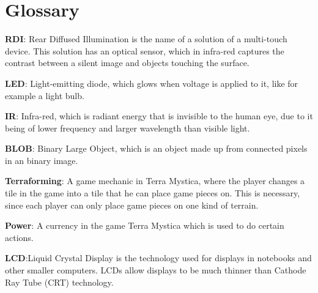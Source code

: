 \chapter*{Glossary}\label{gloss}

\textbf{RDI}: Rear Diffused Illumination is the name of a solution of a multi-touch device\citep{multiTT}. This solution has an optical sensor, which in infra-red captures the contrast between a silent image and objects touching the surface.

\textbf{LED}: Light-emitting diode, which glows when voltage is applied to it, like for example a light bulb.

\textbf{IR}: Infra-red, which is radiant energy that is invisible to the human eye, due to it being of lower frequency and larger wavelength than visible light.

\textbf{BLOB}: Binary Large Object, which is an object made up from connected pixels in an binary image. 

\textbf{Terraforming}: A game mechanic in Terra Mystica, where the player changes a tile in the game into a tile that he can place game pieces on. This is necessary, since each player can only place game pieces on one kind of terrain.

\textbf{Power}: A currency in the game Terra Mystica which is used to do certain actions.

\textbf{LCD}:Liquid Crystal Display is the technology used for displays in notebooks and other smaller computers. LCDs allow displays to be much thinner than Cathode Ray Tube (CRT) technology.